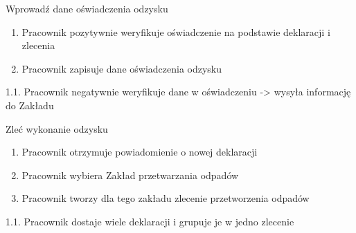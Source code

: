 	\begin{usecase}{Wprowadź dane oświadczenia odzysku}
	\author{Dawid Suder} 
	\maketitle
\begin{scenario} 
		\begin{enumerate}
			\item Pracownik pozytywnie weryfikuje oświadczenie na podstawie deklaracji i zlecenia
			\item Pracownik zapisuje dane oświadczenia odzysku
		\end{enumerate}
	\end{scenario}
\begin{extensions}
			1.1. Pracownik negatywnie weryfikuje dane w oświadczeniu -> wysyła informację do Zakładu
	\end{extensions}
\end{usecase}

	\begin{usecase}{Zleć wykonanie odzysku}
		\author{Dawid Suder} 
		\maketitle
\begin{scenario} 
			\begin{enumerate}
				\item Pracownik otrzymuje powiadomienie o nowej deklaracji
				\item Pracownik wybiera Zakład przetwarzania odpadów
				\item Pracownik tworzy dla tego zakładu zlecenie przetworzenia odpadów
			\end{enumerate}
		\end{scenario}
\begin{extensions}
				1.1. Pracownik dostaje wiele deklaracji i grupuje je w jedno zlecenie
	\end{extensions}
\end{usecase}

